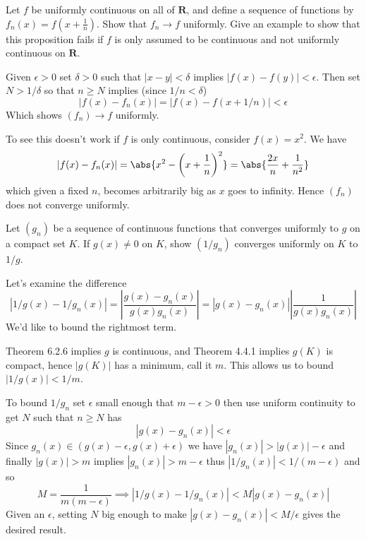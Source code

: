 \begin{exercise}
  Let $f$ be uniformly continuous on all of $\mathbf{R}$, and define a sequence of functions by $f_{n}(x)=f\left(x+\frac{1}{n}\right)$. Show that $f_{n} \rightarrow f$ uniformly. Give an example to show that this proposition fails if $f$ is only assumed to be continuous and not uniformly continuous on $\mathbf{R}$.

\end{exercise}
\begin{solution}
  Given $\epsilon>0$ set $\delta>0$ such that $|x-y|<\delta$ implies $|f(x)-f(y)|<\epsilon$.
  Then set $N > 1/\delta$ so that $n \ge N$ implies (since $1/n<\delta$)
  $$
  |f(x) - f_n(x)| = |f(x) - f(x+1/n)| < \epsilon
  $$
  Which shows $(f_n) \to f$ uniformly.

  To see this doesn't work if $f$ is only continuous, consider $f(x) = x^2$.
  We have
\[
|f(x)-f_n(x)| = \abs{x^2 - \left(x + \frac{1}{n}\right)^2} = \abs{\frac{2x}{n} + \frac{1}{n^2}}
\]
  which given a fixed $n$, becomes arbitrarily big as $x$ goes to infinity. Hence $(f_n)$ does not converge uniformly.
\end{solution}
\begin{exercise}
  Let $\left(g_{n}\right)$ be a sequence of continuous functions that converges uniformly to $g$ on a compact set $K$. If $g(x) \neq 0$ on $K$, show $\left(1 / g_{n}\right)$ converges uniformly on $K$ to $1 / g$.

\end{exercise}
\begin{solution}
  Let's examine the difference
  $$
  |1/g(x) - 1/g_n(x)|
  = \left|\frac{g(x)-g_n(x)}{g(x)g_n(x)}\right|
  = \left|g(x)-g_n(x)\right|\left|\frac{1}{g(x)g_n(x)}\right|
  $$
  We'd like to bound the rightmost term.

  Theorem 6.2.6 implies $g$ is continuous, and Theorem 4.4.1 implies $g(K)$ is compact, hence $|g(K)|$ has a minimum, call it $m$. This allows us to bound $|1/g(x)| < 1/m$.

  To bound $1/g_n$ set $\epsilon$ small enough that $m-\epsilon>0$ then use uniform continuity to get $N$ such that $n \ge N$ has
  $$
  |g(x) - g_n(x)| < \epsilon
  $$
  Since $g_n(x) \in (g(x)-\epsilon, g(x)+\epsilon)$ we have $|g_n(x)| > |g(x)|-\epsilon$ and finally $|g(x)|>m$ implies $|g_n(x)|>m-\epsilon$ thus $|1/g_n(x)| < 1/(m-\epsilon)$ and so
  $$
  M = \frac{1}{m(m-\epsilon)} \implies |1/g(x) - 1/g_n(x)| < M|g(x)-g_n(x)|
  $$
  Given an $\epsilon$, setting $N$ big enough to make $|g(x)-g_n(x)| < M/\epsilon$ gives the desired result.
\end{solution}
